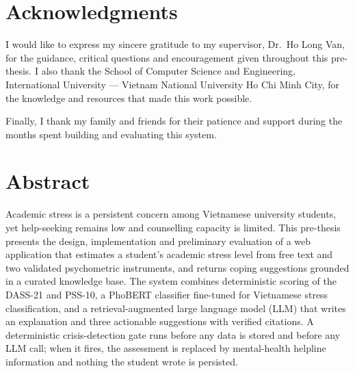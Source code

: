 \documentclass[12pt, twoside]{report}
\begin{document}
\chapter*{Acknowledgments}
I would like to express my sincere gratitude to my supervisor, Dr.~Ho Long Van, for the guidance, critical questions and encouragement given throughout this pre-thesis. I also thank the School of Computer Science and Engineering, International University --- Vietnam National University Ho Chi Minh City, for the knowledge and resources that made this work possible.

Finally, I thank my family and friends for their patience and support during the months spent building and evaluating this system.
\thispagestyle{empty}

\tableofcontents
\listoftables
{}
\listoffigures
{}
\listofalgorithms
{}
\lstlistoflistings
{}

\chapter*{Abstract}
Academic stress is a persistent concern among Vietnamese university students, yet help-seeking remains low and counselling capacity is limited. This pre-thesis presents the design, implementation and preliminary evaluation of a web application that estimates a student's academic stress level from free text and two validated psychometric instruments, and returns coping suggestions grounded in a curated knowledge base. The system combines deterministic scoring of the DASS-21 and PSS-10, a PhoBERT classifier fine-tuned for Vietnamese stress classification, and a retrieval-augmented large language model (LLM) that writes an explanation and three actionable suggestions with verified citations. A deterministic crisis-detection gate runs before any data is stored and before any LLM call; when it fires, the assessment is replaced by mental-health helpline information and nothing the student wrote is persisted.
\end{document}
